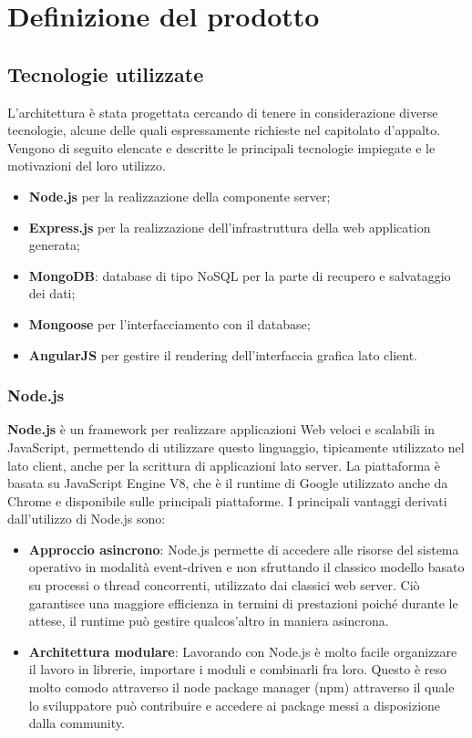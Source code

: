 \section{Definizione del prodotto}


\subsection{Tecnologie utilizzate}
L'architettura è stata progettata cercando di tenere in considerazione diverse tecnologie, alcune delle quali espressamente richieste nel capitolato d'appalto. Vengono di seguito elencate e descritte le principali tecnologie impiegate e le motivazioni del loro utilizzo.

\begin{itemize}
	\item \textbf{Node.js} per la realizzazione della componente server;
	\item \textbf{Express.js} per la realizzazione dell’infrastruttura della web application generata;
	\item \textbf{MongoDB}: database di tipo NoSQL per la parte di recupero e salvataggio dei dati;
	\item \textbf{Mongoose} per l’interfacciamento con il database;
	\item \textbf{AngularJS} per gestire il rendering dell'interfaccia grafica lato client.
\end{itemize}


\subsubsection{Node.js}
\textbf{Node.js} è un framework per realizzare applicazioni Web veloci e scalabili in JavaScript, permettendo di utilizzare questo linguaggio, tipicamente utilizzato nel lato client, anche per la scrittura di applicazioni lato server.
La piattaforma è basata su JavaScript Engine V8, che è il runtime di Google utilizzato anche da Chrome e disponibile sulle principali piattaforme. \newline
I principali vantaggi derivati dall'utilizzo di Node.js sono:
\begin{itemize}
	\item \textbf{Approccio asincrono}: Node.js permette di accedere alle risorse del sistema operativo in modalità event-driven e non sfruttando il classico modello basato su processi o thread concorrenti, utilizzato dai classici web server. Ciò garantisce una maggiore efficienza in termini di prestazioni poiché durante le attese, il runtime può gestire qualcos’altro in maniera asincrona.
	\item \textbf{Architettura modulare}: Lavorando con Node.js è molto facile organizzare il lavoro in librerie, importare i moduli e combinarli fra loro. Questo è reso molto comodo attraverso il node package manager (npm) attraverso il quale lo sviluppatore può contribuire e accedere ai package messi a disposizione dalla community.
\end{itemize}

